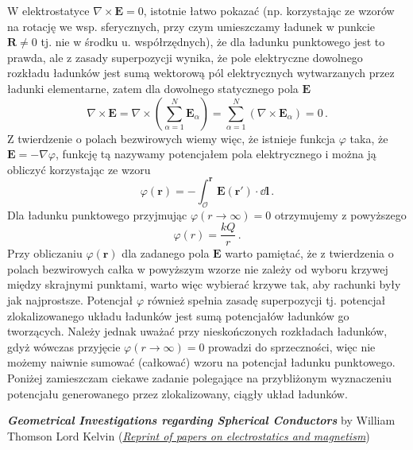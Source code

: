\documentclass[../main.tex]{subfiles}
\begin{document}
W elektrostatyce \(\nabla\times\mathbf{E}=0\), istotnie łatwo pokazać (np. korzystając ze wzorów na
rotację we wsp. sferycznych, przy czym umieszczamy ładunek w punkcie \(\mathbf{R}\neq 0\) tj. nie w
środku u. współrzędnych), że dla ładunku punktowego jest to prawda, ale z zasady superpozycji
wynika, że pole elektryczne dowolnego rozkładu ładunków jest sumą wektorową pól elektrycznych
wytwarzanych przez ładunki elementarne, zatem dla dowolnego statycznego pola \(\mathbf{E}\)
\begin{equation*}
    \nabla\times\mathbf{E}=\nabla\times\left(\sum_{\alpha=1}^N\mathbf{E}_\alpha\right)=\sum_{\alpha=1}^N(\nabla\times\mathbf{E}_\alpha)=0\,.
\end{equation*}
Z twierdzenie o polach bezwirowych wiemy więc, że istnieje funkcja \(\varphi\) taka, że
\(\mathbf{E}=-\nabla\varphi\), funkcję tą nazywamy potencjałem pola elektrycznego i można ją
obliczyć korzystając ze wzoru
\begin{equation*}
    \varphi(\mathbf{r})=-\int_\mathcal{O}^\mathbf{r}\mathbf{E}(\mathbf{r}')\cdot\dd\mathbf{l\,.}
\end{equation*}
Dla ładunku punktowego przyjmując \(\varphi(r\to\infty)=0\) otrzymujemy z powyższego
\begin{equation*}
    \varphi(r)=\frac{kQ}{r}\,.
\end{equation*}
Przy obliczaniu \(\varphi(\mathbf{r})\) dla zadanego pola \(\mathbf{E}\) warto pamiętać, że z
twierdzenia o polach bezwirowych całka w powyższym wzorze nie zależy od wyboru krzywej między
skrajnymi punktami, warto więc wybierać krzywe tak, aby rachunki były jak najprostsze. Potencjał
\(\varphi\) również spełnia zasadę superpozycji tj. potencjał zlokalizowanego układu ładunków jest
sumą potencjałów ładunków go tworzących. Należy jednak uważać przy nieskończonych rozkładach
ładunków, gdyż wówczas przyjęcie \(\varphi(r\to\infty)=0\) prowadzi do sprzeczności, więc nie możemy
naiwnie sumować (całkować) wzoru na potencjał ładunku punktowego. Poniżej zamieszczam ciekawe
zadanie polegające na przybliżonym wyznaczeniu potencjału generowanego przez zlokalizowany, ciągły
układ ładunków.
\medskip

\textit{\textbf{Geometrical Investigations regarding Spherical Conductors}} by William Thomson Lord
Kelvin
(\href{https://archive.org/details/reprintofpaperso00kelv/page/56/mode/2up?view=theater}{\textit{Reprint
of papers on electrostatics and magnetism}})
\end{document}
